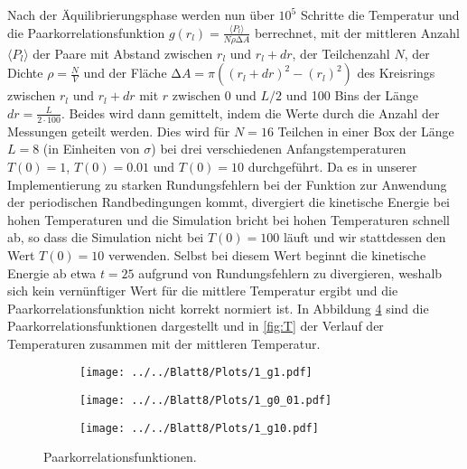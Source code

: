 Nach der Äquilibrierungsphase werden nun über $10^{5}$ Schritte die Temperatur und die Paarkorrelationsfunktion
$g(r_l)=\frac{\langle P_l \rangle}{N\rho\increment A}$ berrechnet, mit der mittleren Anzahl $\langle P_l \rangle$ der Paare mit Abstand zwischen $r_l$ und $r_l+dr$, der Teilchenzahl $N$, der Dichte $\rho=\frac{N}{V}$ und der Fläche $\increment A=\pi((r_l+dr)^2-(r_l)^2)$ des Kreisrings zwischen
$r_l$ und $r_l+dr$ mit $r$ zwischen 0 und $L/2$ und 100 Bins der Länge $dr=\frac{L}{2\cdot100}$.
Beides wird dann gemittelt, indem die Werte durch die Anzahl der Messungen geteilt werden. Dies wird für $N=16$ Teilchen in einer
Box der Länge $L=8$ (in Einheiten von $\sigma$) bei drei verschiedenen Anfangstemperaturen $T(0)=1$, $T(0)=0.01$ und
$T(0)=10$ durchgeführt. Da es in unserer Implementierung zu starken Rundungsfehlern bei der Funktion zur Anwendung der periodischen Randbedingungen
kommt, divergiert die kinetische Energie bei hohen Temperaturen und die Simulation bricht bei hohen Temperaturen schnell
ab, so dass die Simulation nicht bei $T(0)=100$ läuft und wir stattdessen den Wert $T(0)=10$ verwenden. Selbst bei diesem Wert beginnt die kinetische Energie ab etwa $t=25$ aufgrund von Rundungsfehlern zu divergieren, weshalb sich kein vernünftiger Wert für die mittlere Temperatur ergibt und die Paarkorrelationsfunktion nicht korrekt normiert ist.
In Abbildung \ref{fig:G} sind die Paarkorrelationsfunktionen dargestellt und in \ref{fig:T} der Verlauf der Temperaturen zusammen mit der mittleren Temperatur.
\begin{figure}[H]
\begin{subfigure}[c]{0.5\textwidth}
\texttt{[image: ../../Blatt8/Plots/1\_g1.pdf]}
\label{fig:g_1}
\end{subfigure}
\begin{subfigure}[c]{0.5\textwidth}
\texttt{[image: ../../Blatt8/Plots/1\_g0\_01.pdf]}
\label{fig:g_0_01}
\end{subfigure}
\begin{subfigure}[c]{0.5\textwidth}
\texttt{[image: ../../Blatt8/Plots/1\_g10.pdf]}
\label{fig:g_10}
\end{subfigure}
\caption{Paarkorrelationsfunktionen.}
\label{fig:G}
\end{figure}

